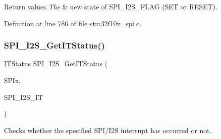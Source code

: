 \begin{DoxyRetVals}{Return values}
{\em The} & new state of S\+P\+I\+\_\+\+I2\+S\+\_\+\+F\+L\+AG (S\+ET or R\+E\+S\+ET). \\
\hline
\end{DoxyRetVals}


Definition at line 786 of file stm32f10x\+\_\+spi.\+c.

\mbox{\label{group___s_p_i___exported___functions_ga72decbc1cd79f8fad92a2204beca6bc5}} 
\subsubsection{\texorpdfstring{S\+P\+I\+\_\+\+I2\+S\+\_\+\+Get\+I\+T\+Status()}{SPI\_I2S\_GetITStatus()}}
{\footnotesize\ttfamily \hyperlink{group___exported__types_gaacbd7ed539db0aacd973a0f6eca34074}{I\+T\+Status} S\+P\+I\+\_\+\+I2\+S\+\_\+\+Get\+I\+T\+Status (\begin{DoxyParamCaption}\item[{\hyperlink{struct_s_p_i___type_def}{S\+P\+I\+\_\+\+Type\+Def} $\ast$}]{S\+P\+Ix,  }\item[{uint8\+\_\+t}]{S\+P\+I\+\_\+\+I2\+S\+\_\+\+IT }\end{DoxyParamCaption})}



Checks whether the specified S\+P\+I/\+I2S interrupt has occurred or not. 


